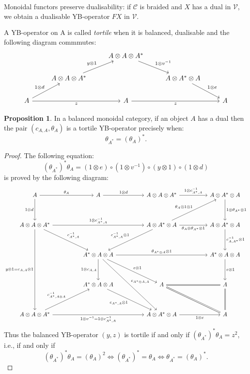\documentclass[8pt]{article}
\theoremstyle{definition}
\theoremstyle{definition}
\theoremstyle{definition}
\theoremstyle{definition}
\theoremstyle{definition}
\theoremstyle{definition}
\theoremstyle{definition}
\newtheorem{prop}{Proposition}[section]
\theoremstyle{definition}
\theoremstyle{definition}
\theoremstyle{definition}
\theoremstyle{definition}
\theoremstyle{definition}
\theoremstyle{definition}
\theoremstyle{definition}
\theoremstyle{question}
\begin{document}
  Monoidal functors preserve dualisability: if $\mathcal{C}$ is braided and $X$ has a dual in $\mathcal{V}$, we obtain a dualisable YB-operator $F X$ in $\mathcal{V}$.

  A YB-operator on A is called \emph{tortile} when it is balanced, dualisable and the following diagram commmutes:
  \[
  \begin{tikzcd}
    && A \otimes A \otimes A^* \ar[dr, "1 \otimes v^{-1}"] \\
    & A \otimes A \otimes A^* \ar[ur, "y \otimes 1"] && A \otimes A^* \otimes A \ar[dr, "1 \otimes e"] \\
    A \ar[rr, "z"'] \ar[ur, "1 \otimes d"] && A \ar[rr, "z"'] && A
  \end{tikzcd}
  \]
  \begin{prop}
    In a balanced monoidal category, if an object $A$ has a dual then the pair $(c_{A,A}, \theta_A)$
    is a tortile YB-operator precisely when:
    \[
    \theta_{A^*} = (\theta_A)^*.
    \]
  \end{prop}
  \begin{proof}
    The following equation:
    \[
    (\theta_{A^*})^* \theta_A = (1 \otimes e) \circ (1 \otimes v^{-1}) \circ (y \otimes 1) \circ (1 \otimes d)
    \]
    is proved by the following diagram:
    \[
    \begin{tikzcd}
      A \ar[rr, "\theta_A"] \ar[dd, "1 \otimes d"'] && A \ar[rr, "1 \otimes d"] && A \otimes A \otimes A^* \ar[rr, "1 \otimes c^{-1}_{A^*,A}"] && A \otimes A^* \otimes A \ar[dd, "1 \otimes \theta_{A^*} \otimes 1"] \\
      \\
      A \otimes A \otimes A^* \ar[ddrr, "c^{-1}_{A^*,A}"] \ar[rrrr, "1 \otimes c^{-1}_{A^*,A}"] \ar[dddddd, "y \otimes 1 = c_{A,A} \otimes 1"'] &&&& A \otimes A^* \otimes A \ar[ddll, "c^{-1}_{A^*,A} \otimes 1"'] \ar[rr, "\theta_A \otimes \theta_{A^*} \otimes 1"'] \ar[uurr, "\theta_A \otimes 1 \otimes 1"] && A \otimes A^* \otimes A \ar[dd, "c^{-1}_{A,A^*} \otimes 1"]\\
      \\
      && A^* \otimes A \otimes A \ar[rrrr, "\theta_{A^* \otimes A} \otimes 1"] \ar[ddddrr, "c_{A^* \otimes A,A}"] \ar[dd, "1 \otimes c_{A,A}"'] \ar[ddrr, "e \otimes 1"] &&&& A^* \otimes A \otimes A \ar[dd, "e \otimes 1"] \\
      \\
      && A^* \otimes A \otimes A \ar[ddrr, "c_{A^*,A} \otimes 1"'] && A \ar[rr, equal] \ar[ddrr, equal] && A \ar[dd, equal] \\
      \\
      A \otimes A \otimes A^* \ar[uurr, "c^{-1}_{A^*,A \otimes A}"] \ar[rrrr, "1 \otimes v^{-1} = 1 \otimes c^{-1}_{A^*,A}"'] &&&& A \otimes A^* \otimes A \ar[rr, "1 \otimes e"'] && A
    \end{tikzcd}
    \]
    Thus the balanced YB-operator $(y,z)$ is tortile if and only if $(\theta_{A^*})^* \theta_A = z^2$, i.e., if and only
    if
    \[
    (\theta_{A^*})^* \theta_A = (\theta_A)^2 \Leftrightarrow (\theta_{A^*})^* = \theta_A \Leftrightarrow \theta_{A^*} = (\theta_A)^*.
    \]
  \end{proof}
\end{document}

